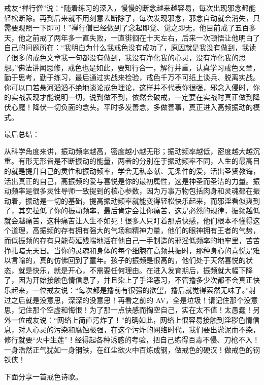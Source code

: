 戒友“禅行僧”说：“随着练习的深入，慢慢的断念越来越容易，每次出现邪念都能轻松断除。再到后来就不用刻意去断除了，每次发现邪念，邪念自动就会消失，只需要观照一下即可！”禅行僧已经做到了念起即觉、觉之即无，他目前戒了五百多天，他之前戒了两年多一直失败，一直徘徊在十天左右，后来一次顿悟让他明白了自己的问题所在：“我明白为什么我戒色没有成功了，原因就是我没有做到，我读了很多的戒色文章我一句都没有做到，我没有净化我的心灵，没有净化我的思想。”佛法讲闻思修，戒色也是如此，要知行合一，解行并重，认真学习戒色文章，勤于思考，勤于练习，最后通过实战来检验，戒色千万不可纸上谈兵、脱离实战。你可以口若悬河滔滔不绝地谈论戒色理论，这样并不代表你很强，邪念入侵时，你的实战表现才能说明一切，说到做不到，依然会破戒，一定要在实战时真正做到降伏心魔！降伏一切负面的念头。平时多发善念，多做善事，真正进入高频振动的模式。

最后总结：

从科学角度来讲，振动频率越高，密度越小越无形；振动频率越低，密度越大越沉重。有形无形皆是不断振动的能量，两者的分别在于振动频率不同，人生的最高目的就是提升自己的灵性和振动频率，学会无私奉献、无条件的爱，活出圣贤教诲，活出真正的自己，高振频的爱与喜悦是你的最初属性，这是神圣而圣洁的力量。振动频率是很多灵性导师一致提到的核心参数，因为万事万物包括肉身和灵魂都在振动着，振动是一切的基础，提高振动频率就能变得轻松快乐起来，而邪淫看似爽到了，其实拉低了你的振动频率，最后肯定会让你痛苦，这是必然的规律，振频越低就会越痛苦，这种痛苦让人生不如死！很多人只盯着那点快感，他们根本不懂得这个道理，高振频的存有拥有强大的气场和精神力量，他们的眼神拥有王者的气势，而低振频的存有只能苟延残喘地活在他自己一手制造的邪淫低频率的地牢里，苦苦挣扎暗无天日。当你的灵魂和身体的每个细胞在高频共振时，那种身心的喜悦是难以言喻的，真的仿佛回到了童年。孩子的振频是很高的，他们处于天然喜悦的状态，就是快乐，就是开心，不需要任何理由。在进入发育期后，振频就大幅下降了，因为开始接触色情信息了，并且染上了手淫恶习，不管撸多少次都不会真正快乐起来，一位戒友说：“每次都是撸前有很强的欲望，撸后就觉得索然无味了。”射过之后就是没意思，深深的没意思！再看之前的 AV，全是垃圾！请记住那个没意思，记住那个空虚和悔恨！为了那一点快感而掏空自己，实在太不值！太愚蠢！另外一位戒友说：“网络上简直污炸了！”的确如此，网络上很容易接触到淫秽色情信息，对人心灵的污染和腐蚀极强，在这个污炸的网络时代，我们要出淤泥而不染，修行就要“火中生莲”！经得起各种诱惑的考验，把自己练得百毒不侵、刀枪不入！一身浩然正气犹如一身钢铁，在红尘欲火中百炼成钢，做戒色的硬汉！做戒色的钢铁侠！

下面分享一首戒色诗歌。

